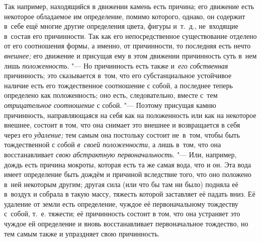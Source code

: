 Так например, находящийся в движении камень есть причина; его движение есть
некоторое обладаемое им определение, помимо которого, однако, он содержит
в~себе ещё многие другие определения цвета, фигуры и~т.~д., не~входящие
в~состав его причинности. Так как его непосредственное существование отделено
от его соотношения формы, а именно, от причинности, то последняя есть нечто
{\em внешнее;} его движение и присущая ему в этом движении причинность суть
в~нем лишь {\em положенность}. "--- Но причинность есть также и~{\em его
собственная} причинность; это сказывается в~том, что его субстанциальное
устойчивое наличие есть его тождественное соотношение с собой, а последнее
теперь определено как положенность; оно есть, следовательно, вместе с~тем
{\em отрицательное соотношение} с собой. "--- Поэтому присущая камню
причинность, направляющаяся на себя как на положенность или как на некоторое
внешнее, состоит в том, что она снимает это внешнее и возвращается в себя через
его {\em удаление;} тем самым она постольку состоит не~в~том, чтобы быть
тождественной с собой {\em в~своей положенности,} а лишь в~том, что она
восстанавливает {\em свою абстрактную первоначальность}. "--- Или, например,
дождь есть причина мокроты, которая есть та же самая вода, что и он. Эта вода
имеет определение быть дождём и причиной вследствие того, что оно положено
в~ней некоторым другим; другая сила (или что бы там ни было) подняла её
в~воздух и собрала в такую массу, тяжесть которой заставляет её падать вниз. Её
удаление от земли есть определение, чуждое её первоначальному тождеству
с~собой, т.~е. тяжести; её причинность состоит в том, что она устраняет это
чуждое ей определение и вновь восстанавливает первоначальное тождество, но тем
самым также и упраздняет свою причинность.

